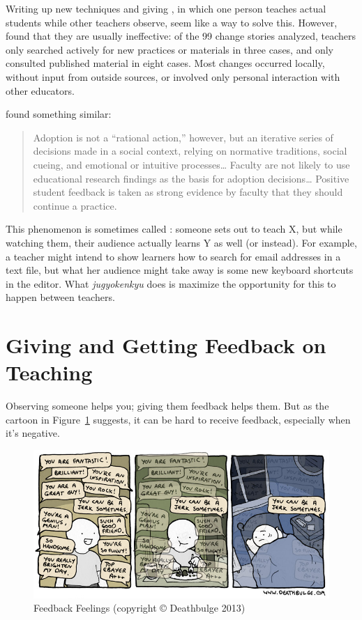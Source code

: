 Writing up new techniques and giving , in which one person teaches actual
students while other teachers observe, seem like a way to solve
this. However, \cite{Finc2007,Finc2012} found that they
are usually ineffective: of the 99 change stories analyzed, teachers
only searched actively for new practices or materials in three cases,
and only consulted published material in eight cases. Most changes
occurred locally, without input from outside sources, or involved only
personal interaction with other educators.

\cite{Bark2015} found something similar:

\begin{quote}

Adoption is not a ``rational action,'' however, but an iterative series
of decisions made in a social context, relying on normative
traditions, social cueing, and emotional or intuitive
processes\ldots{} Faculty are not likely to use educational
research findings as the basis for adoption decisions\ldots{}
Positive student feedback is taken as strong evidence by faculty that
they should continue a practice.

\end{quote}

This phenomenon is sometimes called : someone sets out to teach X,
but while watching them, their audience actually learns Y as well (or
instead). For example, a teacher might intend to show learners how to
search for email addresses in a text file, but what her audience might
take away is some new keyboard shortcuts in the editor. What
\emph{jugyokenkyu} does is maximize the opportunity for this to happen
between teachers.

\section{Giving and Getting Feedback on Teaching}\label{s:performance-feedback}

Observing someone helps you; giving them feedback helps them. But as the
cartoon in Figure~\ref{f:performance-feedback-feelings} suggests, it can
be hard to receive feedback, especially when it's negative.

\begin{figure}
\centering
\includegraphics{../../figures/deathbulge-jerk.jpg}
\caption{Feedback Feelings (copyright © Deathbulge 2013)}
\label{f:performance-feedback-feelings}
\end{figure}

